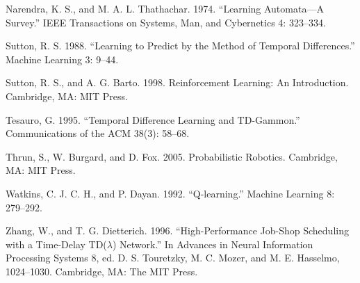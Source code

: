 Narendra, K. S., and M. A. L. Thathachar. 1974. “Learning Automata---A Survey.” IEEE Transactions on Systems, Man, and Cybernetics 4: 323--334.

Sutton, R. S. 1988. “Learning to Predict by the Method of Temporal Differences.” Machine Learning 3: 9--44.

Sutton, R. S., and A. G. Barto. 1998. Reinforcement Learning: An Introduction. Cambridge, MA: MIT Press.

Tesauro, G. 1995. “Temporal Difference Learning and TD-Gammon.” Communications of the ACM 38(3): 58--68.

Thrun, S., W. Burgard, and D. Fox. 2005. Probabilistic Robotics. Cambridge, MA: MIT Press.

Watkins, C. J. C. H., and P. Dayan. 1992. “Q-learning.” Machine Learning 8: 279--292.

Zhang, W., and T. G. Dietterich. 1996. “High-Performance Job-Shop Scheduling with a Time-Delay TD($\lambda$) Network.” In Advances in Neural Information Processing Systems 8, ed. D. S. Touretzky, M. C. Mozer, and M. E. Hasselmo, 1024--1030. Cambridge, MA: The MIT Press.
